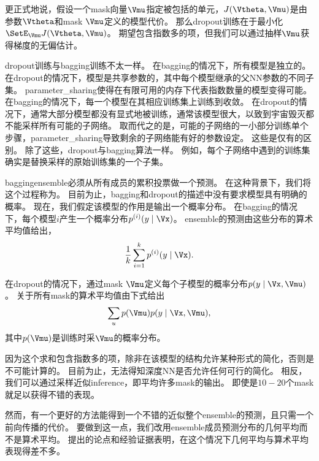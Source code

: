 更正式地说，假设一个\gls{mask}向量$\Vmu$指定被包括的单元，$J(\Vtheta, \Vmu)$是由参数$\Vtheta$和\gls{mask} $\Vmu$定义的模型代价。
那么\gls{dropout}训练在于最小化$\SetE_{\Vmu} J(\Vtheta, \Vmu)$。 
期望包含指数多的项，但我们可以通过抽样$\Vmu$获得梯度的无偏估计。

\gls{dropout}训练与\gls{bagging}训练不太一样。
在\gls{bagging}的情况下，所有模型是独立的。
在\gls{dropout}的情况下，模型是共享参数的，其中每个模型继承的父\gls{NN}参数的不同子集。
\gls{parameter_sharing}使得在有限可用的内存下代表指数数量的模型变得可能。
在\gls{bagging}的情况下，每一个模型在其相应训练集上训练到收敛。
在\gls{dropout}的情况下，通常大部分模型都没有显式地被训练，通常该模型很大，以致到宇宙毁灭都不能采样所有可能的子网络。
取而代之的是，可能的子网络的一小部分训练单个步骤，\gls{parameter_sharing}导致剩余的子网络能有好的参数设定。
这些是仅有的区别。
除了这些，\gls{dropout}与\gls{bagging}算法一样。
例如，每个子网络中遇到的训练集确实是替换采样的原始训练集的一个子集。

\gls{bagging}\gls{ensemble}必须从所有成员的累积投票做一个预测。
在这种背景下，我们将这个过程称为。
目前为止，\gls{bagging}和\gls{dropout}的描述中没有要求模型具有明确的概率。
现在，我们假定该模型的作用是输出一个概率分布。
在\gls{bagging}的情况下，每个模型$i$产生一个概率分布$p^{(i)}(y \mid \Vx)$。 
\gls{ensemble}的预测由这些分布的算术平均值给出，
\begin{align}
 \frac{1}{k} \sum_{i=1}^k p^{(i)}(y \mid \Vx).
\end{align}

在\gls{dropout}的情况下，通过\gls{mask} $\Vmu$定义每个子模型的概率分布$p(y \mid \Vx, \Vmu)$。
关于所有\gls{mask}的算术平均值由下式给出
\begin{align}
  \sum_{u} p(\Vmu) p(y \mid \Vx, \Vmu),
\end{align}
其中$p(\Vmu)$是训练时采$\Vmu$的概率分布。


因为这个求和包含指数多的项，除非在该模型的结构允许某种形式的简化，否则是不可能计算的。
目前为止，无法得知深度\gls{NN}是否允许任何可行的简化。
相反，我们可以通过采样近似\gls{inference}，即平均许多\gls{mask}的输出。
即使是$10-20$个\gls{mask}就足以获得不错的表现。

然而，有一个更好的方法能得到一个不错的近似整个\gls{ensemble}的预测，且只需一个前向传播的代价。
要做到这一点，我们改用\gls{ensemble}成员预测分布的几何平均而不是算术平均。
\cite{WardeFarley+al-ICLR2014}提出的论点和经验证据表明，在这个情况下几何平均与算术平均表现得差不多。

